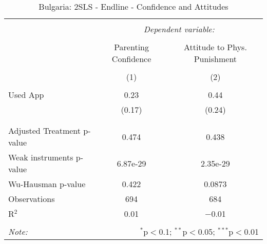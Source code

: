 
\begin{table}[!htbp] \centering 
  \caption{Bulgaria: 2SLS - Endline - Confidence and Attitudes} 
  \label{tbl:Bulgaria: 2SLS - Endline - Confidence and Attitudes} 
\begin{tabular}{@{\extracolsep{5pt}}lcc} 
\\[-1.8ex]\hline 
\hline \\[-1.8ex] 
 & \multicolumn{2}{c}{\textit{Dependent variable:}} \\ 
\cline{2-3} 
\\[-1.8ex] & Parenting Confidence & Attitude to Phys. Punishment \\ 
\\[-1.8ex] & (1) & (2)\\ 
\hline \\[-1.8ex] 
 Used App & 0.23 & 0.44 \\ 
  & (0.17) & (0.24) \\ 
  & & \\ 
\hline \\[-1.8ex] 
Adjusted Treatment p-value & 0.474 & 0.438 \\ 
Weak instruments p-value & 6.87e-29 & 2.35e-29 \\ 
Wu-Hausman p-value & 0.422 & 0.0873 \\ 
Observations & 694 & 684 \\ 
R$^{2}$ & 0.01 & $-$0.01 \\ 
\hline 
\hline \\[-1.8ex] 
\textit{Note:}  & \multicolumn{2}{r}{$^{*}$p$<$0.1; $^{**}$p$<$0.05; $^{***}$p$<$0.01} \\ 
\end{tabular} 
\end{table} 
